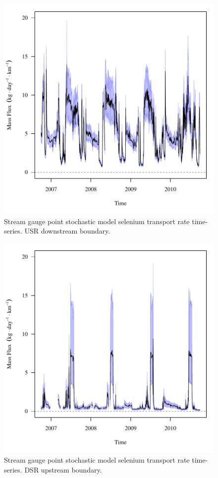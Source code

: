 \begin{figure}[htbp]
	\begin{center}
	\includegraphics[width=6in]{"Figures/Results_USR/f U201"}
	\caption{Stream gauge point stochastic model selenium transport rate time-series.  USR downstream boundary.}
	\end{center}
\end{figure}
\newpage

\begin{figure}[htbp]
	\begin{center}
	\includegraphics[width=6in]{"Figures/Results_DSR/f D101C"}
	\caption{Stream gauge point stochastic model selenium transport rate time-series.  DSR upstream boundary.}
	\end{center}
\end{figure}
\newpage

